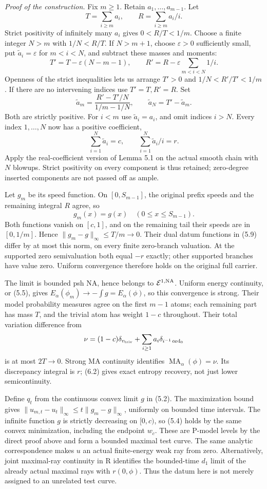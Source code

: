 \documentclass[
  11pt,
]{article}
\begin{document}
\emph{Proof of the construction.} Fix \(m\geq1\). Retain
\(a_1,\ldots,a_{m-1}\). Let
\[ T=\sum_{i\geq m}a_i,\qquad R=\sum_{i\geq m}a_i/i.\] Strict positivity
of infinitely many \(a_i\) gives \(0<R/T<1/m\). Choose a finite integer
\(N>m\) with \(1/N<R/T\). If \(N>m+1\), choose \(\varepsilon>0\)
sufficiently small, put \(\widetilde a_i=\varepsilon\) for \(m<i<N\),
and subtract these masses and moments: \[
 T'=T-\varepsilon(N-m-1),\qquad
 R'=R-\varepsilon\sum_{m<i<N}1/i.
\] Openness of the strict inequalities lets us arrange \(T'>0\) and
\(1/N<R'/T'<1/m\). If there are no intervening indices use
\(T'=T,R'=R\). Set \[
 \widetilde a_m=\frac{R'-T'/N}{1/m-1/N},\qquad
 \widetilde a_N=T'-\widetilde a_m.
 \tag{6.1}
\] Both are strictly positive. For \(i<m\) use \(\widetilde a_i=a_i\),
and omit indices \(i>N\). Every index \(1,\ldots,N\) now has a positive
coefficient, \[ \sum_{i=1}^N\widetilde a_i=c,\qquad
    \sum_{i=1}^N\widetilde a_i/i=r. \tag{6.2}\] Apply the
real-coefficient version of Lemma 5.1 on the actual smooth chain with
\(N\) blowups. Strict positivity on every component is thus retained;
zero-degree inserted components are not passed off as ample.

Let \(g_m\) be its speed function. On \([0,S_{m-1}]\), the original
prefix speeds and the remaining integral \(R\) agree, so
\[ g_m(x)=g(x)\quad(0\leq x\leq S_{m-1}). \tag{6.3}\] Both functions
vanish on \([c,1]\), and on the remaining tail their speeds are in
\([0,1/m]\). Hence \(\|g_m-g\|_\infty\leq T/m\to0\). Their dual datum
functions in (5.9) differ by at most this norm, on every finite
zero-branch valuation. At the supported zero semivaluation both equal
\(-r\) exactly; other supported branches have value zero. Uniform
convergence therefore holds on the original full carrier.

The limit is bounded psh NA, hence belongs to \(\mathcal E^{1,\rm NA}\).
Uniform energy continuity, or (5.5), gives
\(E_\alpha(\phi_m)\to-\int g=E_\alpha(\phi)\), so this convergence is
strong. Their model probability measures agree on the first \(m-1\)
atoms; each remaining part has mass \(T\), and the trivial atom has
weight \(1-c\) throughout. Their total variation difference from
\[ \nu=(1-c)\delta_{v_{\rm triv}}
              +\sum_{i\geq1}a_i\delta_{i^{-1}\operatorname{ord}_0}\] is
at most \(2T\to0\). Strong MA continuity identifies
\(\operatorname{MA}_\alpha(\phi)=\nu\). Its discrepancy integral is
\(r\); (6.2) gives exact entropy recovery, not just lower
semicontinuity.

Define \(q_t\) from the continuous convex limit \(g\) in (5.2). The
maximization bound gives
\(\|u_{m,t}-u_t\|_\infty\leq t\|g_m-g\|_\infty\), uniformly on bounded
time intervals. The infinite function \(g\) is strictly decreasing on
\([0,c)\), so (5.4) holds by the same convex minimization, including the
endpoint \(w_c\). These are P-model levels by the direct proof above and
form a bounded maximal test curve. The same analytic correspondence
makes \(u\) an actual finite-energy weak ray from zero. Alternatively,
joint maximal-ray continuity in R identifies the bounded-time \(d_1\)
limit of the already actual maximal rays with \(r(0,\phi)\). Thus the
datum here is not merely assigned to an unrelated test curve.
\end{document}

